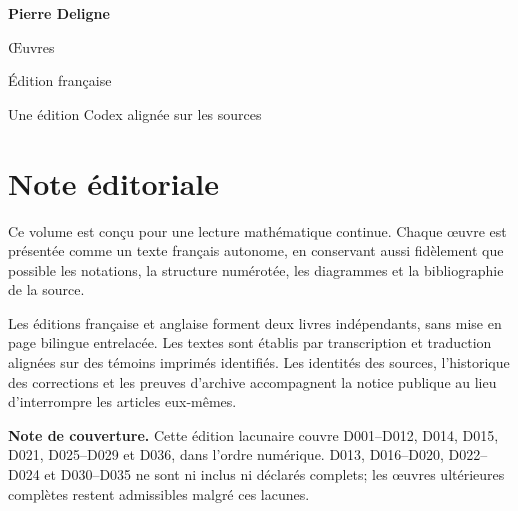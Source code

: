 \documentclass[11pt,a4paper]{article}
\begin{document}
\begin{titlepage}
  \pagecolor{DeligneBlue}
  \color{white}
  \vspace*{34mm}
  {\fontsize{30}{36}\selectfont\bfseries Pierre Deligne\par}
  \vspace{7mm}
  {\fontsize{18}{23}\selectfont Œuvres\par}
  \vspace{4mm}
  {\large Édition française\par}
  \vfill
  {\normalsize Une édition Codex alignée sur les sources\par}
\end{titlepage}
\setcounter{page}{2}
\nopagecolor
\color{DeligneInk}
\section*{Note éditoriale}
Ce volume est conçu pour une lecture mathématique continue. Chaque œuvre est présentée comme un texte français autonome, en conservant aussi fidèlement que possible les notations, la structure numérotée, les diagrammes et la bibliographie de la source.

Les éditions française et anglaise forment deux livres indépendants, sans mise en page bilingue entrelacée. Les textes sont établis par transcription et traduction alignées sur des témoins imprimés identifiés. Les identités des sources, l'historique des corrections et les preuves d'archive accompagnent la notice publique au lieu d'interrompre les articles eux-mêmes.

\textbf{Note de couverture.} Cette édition lacunaire couvre D001--D012, D014, D015, D021, D025--D029 et D036, dans l'ordre numérique. D013, D016--D020, D022--D024 et D030--D035 ne sont ni inclus ni déclarés complets; les œuvres ultérieures complètes restent admissibles malgré ces lacunes.
\end{document}
